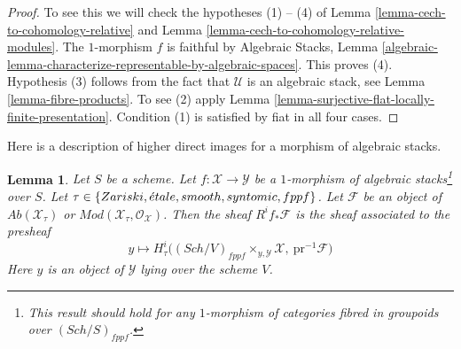 \documentclass{stacks-project}
\theoremstyle{plain}
\newtheorem{lemma}[subsection]{Lemma}
\theoremstyle{definition}
\theoremstyle{remark}
\numberwithin{equation}{subsection}
\def\Sch{\mathit{Sch}}
\def\etale{{\acute{e}tale}}
\begin{document}
\begin{proof}
To see this we will check the hypotheses (1) -- (4) of
Lemma \ref{lemma-cech-to-cohomology-relative} and
Lemma \ref{lemma-cech-to-cohomology-relative-modules}.
The $1$-morphism $f$ is faithful by
Algebraic Stacks, Lemma
\ref{algebraic-lemma-characterize-representable-by-algebraic-spaces}.
This proves (4).
Hypothesis (3) follows from the fact that $\mathcal{U}$ is an algebraic
stack, see
Lemma \ref{lemma-fibre-products}.
To see (2) apply
Lemma \ref{lemma-surjective-flat-locally-finite-presentation}.
Condition (1) is satisfied by fiat in all four cases.
\end{proof}

\noindent
Here is a description of higher direct images for a
morphism of algebraic stacks.

\begin{lemma}
\label{lemma-pushforward-restriction}
Let $S$ be a scheme. Let $f : \mathcal{X} \to \mathcal{Y}$ be a
$1$-morphism of algebraic stacks\footnote{This result should hold
for any $1$-morphism of categories fibred in groupoids over
$(\Sch/S)_{fppf}$.} over $S$.
Let $\tau \in \{Zariski,\linebreak[0] \etale,\linebreak[0]
smooth,\linebreak[0] syntomic,\linebreak[0] fppf\}$.
Let $\mathcal{F}$ be
an object of $\textit{Ab}(\mathcal{X}_\tau)$ or
$\textit{Mod}(\mathcal{X}_\tau, \mathcal{O}_\mathcal{X})$.
Then the sheaf $R^if_*\mathcal{F}$ is the sheaf associated to the
presheaf
$$
y \longmapsto
H^i_\tau\Big((\Sch/V)_{fppf} \times_{y, \mathcal{Y}} \mathcal{X},
\ \text{pr}^{-1}\mathcal{F}\Big)
$$
Here $y$ is an object of $\mathcal{Y}$ lying over the scheme $V$.
\end{lemma}
\end{document}

